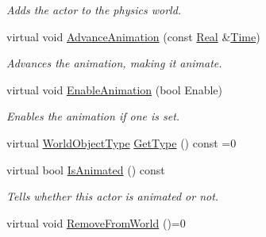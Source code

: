 \begin{DoxyCompactItemize}
\begin{DoxyCompactList}\small\item\em Adds the actor to the physics world. \item\end{DoxyCompactList}\item 
virtual void \hyperlink{classMezzanine_1_1ActorBase_ab245d50e649ec7335bbfcba86d9dc889}{AdvanceAnimation} (const \hyperlink{namespaceMezzanine_a726731b1a7df72bf3583e4a97282c6f6}{Real} \&\hyperlink{structMezzanine_1_1Time}{Time})
\begin{DoxyCompactList}\small\item\em Advances the animation, making it animate. \item\end{DoxyCompactList}\item 
virtual void \hyperlink{classMezzanine_1_1ActorBase_a28c9397e90ec680faf61845525312864}{EnableAnimation} (bool Enable)
\begin{DoxyCompactList}\small\item\em Enables the animation if one is set. \item\end{DoxyCompactList}\item 
virtual \hyperlink{namespaceMezzanine_a30335416fc857844e8360c84d1d1b56c}{WorldObjectType} \hyperlink{classMezzanine_1_1ActorBase_a6e9cce7e660471cc0f9b9df019663f8d}{GetType} () const =0
\item 
virtual bool \hyperlink{classMezzanine_1_1ActorBase_ade1c3e7a2e24df64a79d2acb8d6fc084}{IsAnimated} () const 
\begin{DoxyCompactList}\small\item\em Tells whether this actor is animated or not. \item\end{DoxyCompactList}\item 
\hypertarget{classMezzanine_1_1ActorBase_a30910dd0351bc29b2bf88cb3dc8d83db}{
virtual void \hyperlink{classMezzanine_1_1ActorBase_a30910dd0351bc29b2bf88cb3dc8d83db}{RemoveFromWorld} ()=0}
\label{classMezzanine_1_1ActorBase_a30910dd0351bc29b2bf88cb3dc8d83db}


\end{DoxyCompactItemize}
